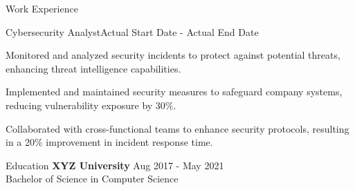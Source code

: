 \documentclass{resume} %
\begin{document}
    \begin{rSection}{Work Experience}
                    \begin{rSubsection}
                {Cybersecurity Analyst}{Actual Start Date - Actual End Date}
                                    {}
                                {}
                                    \item Monitored and analyzed security incidents to protect against potential threats, enhancing threat intelligence capabilities.
                                    \item Implemented and maintained security measures to safeguard company systems, reducing vulnerability exposure by 30\%.
                                    \item Collaborated with cross{-}functional teams to enhance security protocols, resulting in a 20\% improvement in incident response time.
                            \end{rSubsection}
            \end{rSection}

\begin{rSection}{Education}
                        \textbf{XYZ University} \hfill {Aug 2017 - May 2021} \\
                            {Bachelor of Science in Computer Science}
                         
             
         
    \end{rSection}
\end{document}
